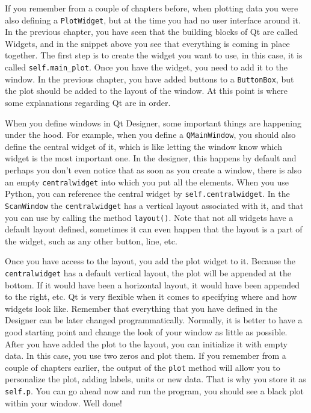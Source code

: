 If you remember from a couple of chapters before, when plotting data you
were also defining a \texttt{PlotWidget}, but at the time you had no
user interface around it. In the previous chapter, you have seen that
the building blocks of Qt are called Widgets, and in the snippet above
you see that everything is coming in place together. The first step is
to create the widget you want to use, in this case, it is called
\texttt{self.main_plot}. Once you have the widget, you need to add it
to the window. In the previous chapter, you have added buttons to a
\texttt{ButtonBox}, but the plot should be added to the layout of the
window. At this point is where some explanations regarding Qt are
in order.

When you define windows in Qt Designer, some important things are
happening under the hood. For example, when you define a
\texttt{QMainWindow}, you should also define the central widget of it,
which is like letting the window know which widget is the most important
one. In the designer, this happens by default and perhaps you don't even
notice that as soon as you create a window, there is also an empty
\texttt{centralwidget} into which you put all the elements. When you use
Python, you can reference the central widget by
\texttt{self.centralwidget}. In the \texttt{ScanWindow} the
\texttt{centralwidget} has a vertical layout associated with it, and
that you can use by calling the method \texttt{layout()}. Note that not
all widgets have a default layout defined, sometimes it can even happen
that the layout is a part of the widget, such as any other button,
line, etc.

Once you have access to the layout, you add the plot widget to it.
Because the \texttt{centralwidget} has a default vertical layout, the
plot will be appended at the bottom. If it would have been a horizontal
layout, it would have been appended to the right, etc. Qt is very
flexible when it comes to specifying where and how widgets look like.
Remember that everything that you have defined in the Designer can be
later changed programmatically. Normally, it is better to have a good
starting point and change the look of your window as little as possible.
After you have added the plot to the layout, you can initialize it with
empty data. In this case, you use two zeros and plot them. If you
remember from a couple of chapters earlier, the output of the
\texttt{plot} method will allow you to personalize the plot, adding
labels, units or new data. That is why you store it as \texttt{self.p}.
You can go ahead now and run the program, you should see a black plot
within your window. Well done!

